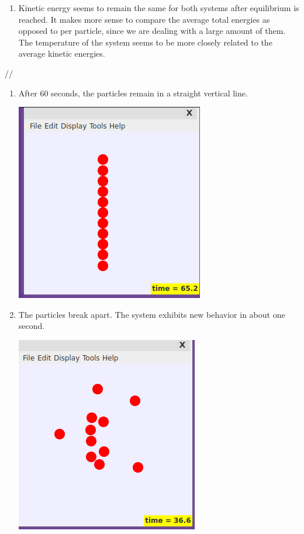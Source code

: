 \documentclass{article}
\newenvironment{problem}[2][Problem]{\begin{trivlist}
\item[\hskip \labelsep {\bfseries #1}\hskip \labelsep {\bfseries #2.}]}{\end{trivlist}}
\begin{document}
\begin{problem}{(Identification of the temperature)}
\begin{enumerate}[label=\alph*)]
		\item Kinetic energy seems to remain the same for both systems after equilibrium is reached. It makes more sense to compare the average total energies as opposed to per particle, since we are dealing with a large amount of them. The temperature of the system seems to be more closely related to the average kinetic energies.
	\end{enumerate}
\end{problem}


\begin{problem}{(Irreversibility)} //
        \begin{enumerate}[label=\alph*)]
                \item After 60 seconds, the particles remain in a straight vertical line. 

                        \includegraphics[scale=0.2]{3a.png}

                \item The particles break apart. The system exhibits new behavior in about one second.

                        \includegraphics[scale=0.2]{3b.png}


\end{enumerate}
\end{problem}
\end{document}
